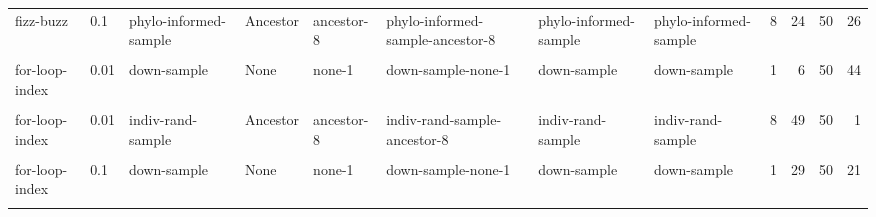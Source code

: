 \documentclass[
]{book}
\begin{document}
\begin{table}
\begin{tabular}{l|l|l|l|l|l|l|l|l|r|r|r}
\hline
\cellcolor{gray!6}{fizz-buzz} & \cellcolor{gray!6}{0.1} & \cellcolor{gray!6}{indiv-rand-sample} & \cellcolor{gray!6}{Ancestor} & \cellcolor{gray!6}{ancestor-8} & \cellcolor{gray!6}{indiv-rand-sample-ancestor-8} & \cellcolor{gray!6}{indiv-rand-sample} & \cellcolor{gray!6}{indiv-rand-sample} & \cellcolor{gray!6}{8} & \cellcolor{gray!6}{19} & \cellcolor{gray!6}{50} & \cellcolor{gray!6}{31}\\
\hline
fizz-buzz & 0.1 & phylo-informed-sample & Ancestor & ancestor-8 & phylo-informed-sample-ancestor-8 & phylo-informed-sample & phylo-informed-sample & 8 & 24 & 50 & 26\\
\hline
\cellcolor{gray!6}{fizz-buzz} & \cellcolor{gray!6}{1} & \cellcolor{gray!6}{full} & \cellcolor{gray!6}{None} & \cellcolor{gray!6}{none-1} & \cellcolor{gray!6}{full-none-1} & \cellcolor{gray!6}{full} & \cellcolor{gray!6}{full} & \cellcolor{gray!6}{1} & \cellcolor{gray!6}{9} & \cellcolor{gray!6}{100} & \cellcolor{gray!6}{91}\\
\hline
for-loop-index & 0.01 & down-sample & None & none-1 & down-sample-none-1 & down-sample & down-sample & 1 & 6 & 50 & 44\\
\hline
\cellcolor{gray!6}{for-loop-index} & \cellcolor{gray!6}{0.01} & \cellcolor{gray!6}{down-sample} & \cellcolor{gray!6}{Ancestor} & \cellcolor{gray!6}{ancestor-8} & \cellcolor{gray!6}{down-sample-ancestor-8} & \cellcolor{gray!6}{down-sample} & \cellcolor{gray!6}{down-sample-ancestor} & \cellcolor{gray!6}{8} & \cellcolor{gray!6}{44} & \cellcolor{gray!6}{50} & \cellcolor{gray!6}{6}\\
\hline
for-loop-index & 0.01 & indiv-rand-sample & Ancestor & ancestor-8 & indiv-rand-sample-ancestor-8 & indiv-rand-sample & indiv-rand-sample & 8 & 49 & 50 & 1\\
\hline
\cellcolor{gray!6}{for-loop-index} & \cellcolor{gray!6}{0.01} & \cellcolor{gray!6}{phylo-informed-sample} & \cellcolor{gray!6}{Ancestor} & \cellcolor{gray!6}{ancestor-8} & \cellcolor{gray!6}{phylo-informed-sample-ancestor-8} & \cellcolor{gray!6}{phylo-informed-sample} & \cellcolor{gray!6}{phylo-informed-sample} & \cellcolor{gray!6}{8} & \cellcolor{gray!6}{50} & \cellcolor{gray!6}{50} & \cellcolor{gray!6}{0}\\
\hline
for-loop-index & 0.1 & down-sample & None & none-1 & down-sample-none-1 & down-sample & down-sample & 1 & 29 & 50 & 21\\
\hline
\cellcolor{gray!6}{for-loop-index} & \cellcolor{gray!6}{0.1} & \cellcolor{gray!6}{down-sample} & \cellcolor{gray!6}{Ancestor} & \cellcolor{gray!6}{ancestor-8} & \cellcolor{gray!6}{down-sample-ancestor-8} & \cellcolor{gray!6}{down-sample} & \cellcolor{gray!6}{down-sample-ancestor} & \cellcolor{gray!6}{8} & \cellcolor{gray!6}{35} & \cellcolor{gray!6}{50} & \cellcolor{gray!6}{15}\\

\end{tabular}
\end{table}
\end{document}
